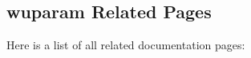 \subsection{wuparam Related Pages}
Here is a list of all related documentation pages:\begin{CompactList}
\item {}

\item {}

\end{CompactList}
